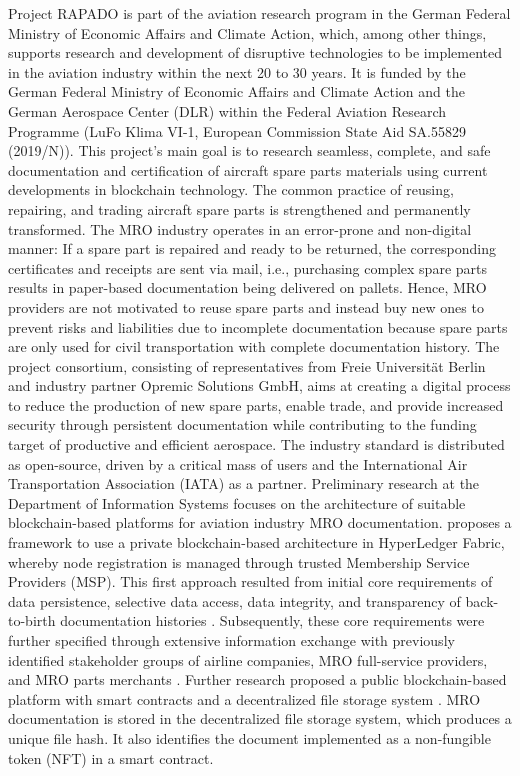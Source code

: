 Project RAPADO is part of the aviation research program in the German Federal Ministry of Economic Affairs and Climate Action, which, among other things, supports research and development of disruptive technologies to be implemented in the aviation industry within the next 20 to 30 years. It is funded by the German Federal Ministry of Economic Affairs and Climate Action and the German Aerospace Center (DLR) within the Federal Aviation Research Programme (LuFo Klima VI-1, European Commission State Aid SA.55829 (2019/N)). This project's main goal is to research seamless, complete, and safe documentation and certification of aircraft spare parts materials using current developments in blockchain technology. The common practice of reusing, repairing, and trading aircraft spare parts is strengthened and permanently transformed. The MRO industry operates in an error-prone and non-digital manner: If a spare part is repaired and ready to be returned, the corresponding certificates and receipts are sent via mail, i.e., purchasing complex spare parts results in paper-based documentation being delivered on pallets. Hence, MRO providers are not motivated to reuse spare parts and instead buy new ones to prevent risks and liabilities due to incomplete documentation because spare parts are only used for civil transportation with complete documentation history. The project consortium, consisting of representatives from Freie Universit{\"a}t Berlin and industry partner Opremic Solutions GmbH, aims at creating a digital process to reduce the production of new spare parts, enable trade, and provide increased security through persistent documentation while contributing to the funding target of productive and efficient aerospace. The industry standard is distributed as open-source, driven by a critical mass of users and the International Air Transportation Association (IATA) as a partner.
Preliminary research at the Department of Information Systems focuses on the architecture of suitable blockchain-based platforms for aviation industry MRO documentation. \citet{WickboldtMeiseKliewer} proposes a framework to use a private blockchain-based architecture in HyperLedger Fabric, whereby node registration is managed through trusted Membership Service Providers (MSP). This first approach resulted from initial core requirements of data persistence, selective data access, data integrity, and transparency of back-to-birth documentation histories \citep{WickboldtClemens2018BzdD}. Subsequently, these core requirements were further specified through extensive information exchange with previously identified stakeholder groups of airline companies, MRO full-service providers, and MRO parts merchants \citep{ZedelJ}. Further research proposed a public blockchain-based platform with smart contracts and a decentralized file storage system \citep{ZedelJ}. MRO documentation is stored in the decentralized file storage system, which produces a unique file hash. It also identifies the document implemented as a non-fungible token (NFT) in a smart contract.
